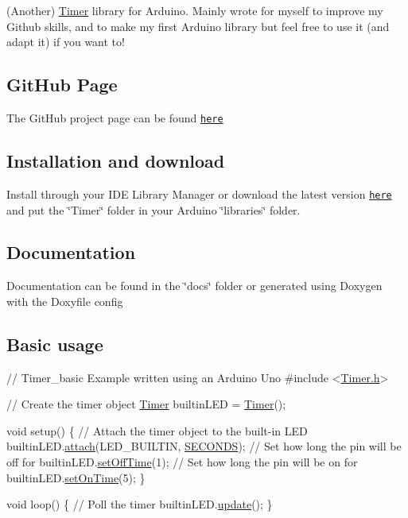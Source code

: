 (Another) \hyperlink{class_timer}{Timer} library for Arduino. Mainly wrote for myself to improve my Github skills, and to make my first Arduino library but feel free to use it (and adapt it) if you want to!

\subsection*{Git\+Hub Page}

The Git\+Hub project page can be found \href{https://github.com/Alftron/Timer}{\tt here}

\subsection*{Installation and download}

Install through your I\+DE Library Manager or download the latest version \href{https://github.com/Alftron/Timer/archive/master.zip}{\tt here} and put the \char`\"{}\+Timer\char`\"{} folder in your Arduino \char`\"{}libraries\char`\"{} folder.

\subsection*{Documentation}

Documentation can be found in the \char`\"{}docs\char`\"{} folder or generated using Doxygen with the Doxyfile config

\subsection*{Basic usage}


\begin{DoxyCode}
\textcolor{comment}{// Timer\_basic Example written using an Arduino Uno}
\textcolor{preprocessor}{#include <\hyperlink{_timer_8h}{Timer.h}>}

\textcolor{comment}{// Create the timer object}
\hyperlink{class_timer}{Timer} builtinLED = \hyperlink{class_timer}{Timer}();


\textcolor{keywordtype}{void} setup()
\{
    \textcolor{comment}{// Attach the timer object to the built-in LED}
    builtinLED.\hyperlink{class_timer_a74db93921810ee98d337ed3cdc2bc513}{attach}(LED\_BUILTIN, \hyperlink{_timer_8h_add9fe45e09605eee3e4a39c8a5c4476da70367ff8e866216e6a822a2c952abfc1}{SECONDS});
    \textcolor{comment}{// Set how long the pin will be off for}
    builtinLED.\hyperlink{class_timer_a47474fcf4efcc8dfd7540b1a7b80b4ce}{setOffTime}(1);
    \textcolor{comment}{// Set how long the pin will be on for}
    builtinLED.\hyperlink{class_timer_a3ec9029748dc5408795d59841497a254}{setOnTime}(5);
\}

\textcolor{keywordtype}{void} loop()
\{
    \textcolor{comment}{// Poll the timer}
    builtinLED.\hyperlink{class_timer_a745ad59b5a46744cd871a1129a25d74f}{update}();
\}
\end{DoxyCode}
 